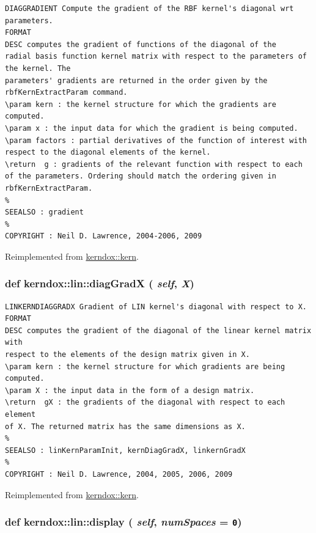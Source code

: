 \footnotesize\begin{verbatim}DIAGGRADIENT Compute the gradient of the RBF kernel's diagonal wrt parameters.
FORMAT
DESC computes the gradient of functions of the diagonal of the
radial basis function kernel matrix with respect to the parameters of the kernel. The
parameters' gradients are returned in the order given by the
rbfKernExtractParam command.
\param kern : the kernel structure for which the gradients are
computed.
\param x : the input data for which the gradient is being computed.
\param factors : partial derivatives of the function of interest with
respect to the diagonal elements of the kernel.
\return  g : gradients of the relevant function with respect to each
of the parameters. Ordering should match the ordering given in
rbfKernExtractParam.
%
SEEALSO : gradient
%
COPYRIGHT : Neil D. Lawrence, 2004-2006, 2009\end{verbatim}
\normalsize
 

Reimplemented from \hyperlink{classkerndox_1_1kern}{kerndox::kern}.\hypertarget{classkerndox_1_1lin_8ea5c54102e2149052b7df6114f16102}{
\subsubsection[{diagGradX}]{\setlength{\rightskip}{0pt plus 5cm}def kerndox::lin::diagGradX ( {\em self}, \/   {\em X})}}
\label{classkerndox_1_1lin_8ea5c54102e2149052b7df6114f16102}




\footnotesize\begin{verbatim}LINKERNDIAGGRADX Gradient of LIN kernel's diagonal with respect to X.
FORMAT
DESC computes the gradient of the diagonal of the linear kernel matrix with
respect to the elements of the design matrix given in X.
\param kern : the kernel structure for which gradients are being computed.
\param X : the input data in the form of a design matrix.
\return  gX : the gradients of the diagonal with respect to each element
of X. The returned matrix has the same dimensions as X.
%
SEEALSO : linKernParamInit, kernDiagGradX, linkernGradX
%
COPYRIGHT : Neil D. Lawrence, 2004, 2005, 2006, 2009

\end{verbatim}
\normalsize
 

Reimplemented from \hyperlink{classkerndox_1_1kern}{kerndox::kern}.\hypertarget{classkerndox_1_1lin_1920b7faa203c45f748c60a04f3e3493}{
\subsubsection[{display}]{\setlength{\rightskip}{0pt plus 5cm}def kerndox::lin::display ( {\em self}, \/   {\em numSpaces} = {\tt 0})}}
\label{classkerndox_1_1lin_1920b7faa203c45f748c60a04f3e3493}




